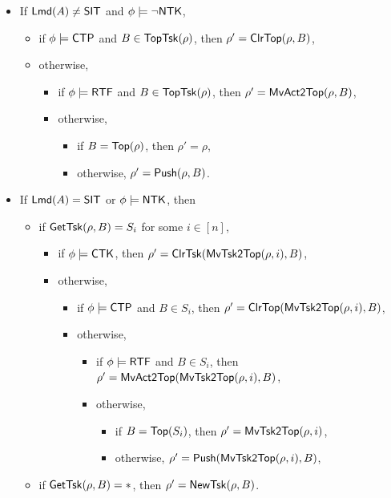 \noindent {}
\begin{itemize}
	\item If ${\sf Lmd}(A) \neq {\sf SIT}$ and $\phi \models \neg {\sf NTK}$, 
	\begin{itemize}
        \item if $\phi \models{\sf CTP}$ and $B \in \mathsf{TopTsk}(\rho)$, then $\rho' =\mathsf{ClrTop}(\rho, B)$,
		\item otherwise,
		\begin{itemize}
			\item if $\phi \models {\sf RTF}$ and $B \in \mathsf{TopTsk}(\rho)$, then $\rho'=\mathsf{MvAct2Top}(\rho, B)$,
			\item otherwise,
			\begin{itemize}
				\item if $B = \mathsf{Top}(\rho)$, then $\rho' = \rho$,
				\item otherwise, $\rho' = \mathsf{Push}(\rho, B)$.
			\end{itemize}
		\end{itemize}
	\end{itemize}
	\item If ${\sf Lmd}(A) = {\sf SIT}$ or $\phi \models {\sf NTK}$, then
	\begin{itemize}
		\item if $\mathsf{GetTsk}(\rho, B) = S_i$ for some $i\in[n]$,
		\begin{itemize}
            \item if $\phi \models{\sf CTK}$, then $\rho' = \mathsf{ClrTsk}(\mathsf{MvTsk2Top}(\rho, i), B)$,
			\item otherwise, 
			\begin{itemize}
				\item if $\phi \models{\sf CTP}$ and $B \in S_i$, then $\rho' =\mathsf{ClrTop}(\mathsf{MvTsk2Top}(\rho, i), B)$,
				\item otherwise,
				\begin{itemize}
					\item if $\phi \models {\sf RTF}$ and $B \in S_i$, then $\rho'=\mathsf{MvAct2Top}(\mathsf{MvTsk2Top}(\rho, i), B)$,
					\item otherwise,
					\begin{itemize}
						\item if $B = \mathsf{Top}(S_i)$, then $\rho' = \mathsf{MvTsk2Top}(\rho, i)$,
						\item otherwise, $\rho'=\mathsf{Push}(\mathsf{MvTsk2Top}(\rho, i), B)$,
					\end{itemize}
				\end{itemize}
			\end{itemize}
		\end{itemize}
		\item if $\mathsf{GetTsk}(\rho, B) = *$, then $\rho' = \mathsf{NewTsk}(\rho, B)$.
	\end{itemize}
\end{itemize}

